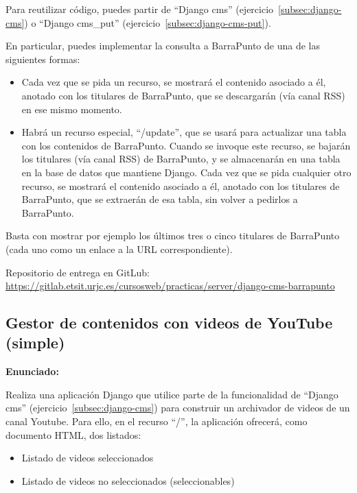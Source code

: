 Para reutilizar código, puedes partir de ``Django cms'' (ejercicio~\ref{subsec:django-cms}) o  ``Django cms\_put'' (ejercicio~\ref{subsec:django-cms-put}).

En particular, puedes implementar la consulta a BarraPunto de una de las siguientes formas:

\begin{itemize}
\item Cada vez que se pida un recurso, se mostrará el contenido asociado a él, anotado con los titulares de BarraPunto, que se descargarán (vía canal RSS) en ese mismo momento.
\item Habrá un recurso especial, ``/update'', que se usará para actualizar una tabla con los contenidos de BarraPunto. Cuando se invoque este recurso, se bajarán los titulares (vía canal RSS) de BarraPunto, y se almacenarán en una tabla en la base de datos que mantiene Django. Cada vez que se pida cualquier otro recurso, se mostrará el contenido asociado a él, anotado con los titulares de BarraPunto, que se extraerán de esa tabla, sin volver a pedirlos a BarraPunto.
\end{itemize}

Basta con mostrar por ejemplo los últimos tres o cinco titulares de BarraPunto (cada uno como un enlace a la URL correspondiente).

Repositorio de entrega en  GitLub: \\
\url{https://gitlab.etsit.urjc.es/cursosweb/practicas/server/django-cms-barrapunto}

\subsection{Gestor de contenidos con videos de YouTube (simple)}
\label{subsec:django-cms-youtube}

\textbf{Enunciado:}

Realiza una aplicación Django que utilice parte de la funcionalidad de ``Django cms'' (ejercicio~\ref{subsec:django-cms}) para construir un archivador de videos de un canal Youtube. Para ello, en el recurso ``/'', la aplicación ofrecerá, como documento HTML, dos listados:

\begin{itemize}
\item Listado de videos seleccionados
\item Listado de videos no seleccionados (seleccionables)
\end{itemize}

